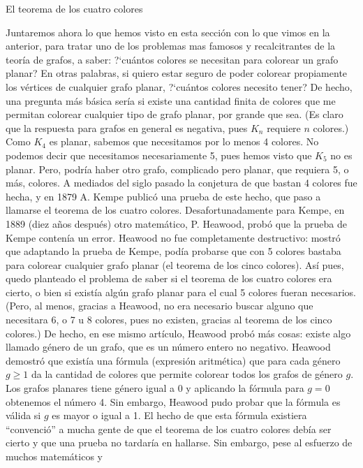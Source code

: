 \documentclass[11pt,spanish,makeidx]{amsbook}
\theoremstyle{definition}
\theoremstyle{remark}
\begin{document}
\begin{section}{El teorema de los cuatro colores} \label{Ap4.3}

Juntaremos ahora lo que hemos visto en esta sección con lo que
vimos en la anterior, para tratar uno de los problemas mas famosos
y recalcitrantes de la teoría de grafos, a saber: ?`cuántos
colores se necesitan para colorear un grafo planar? En otras
palabras, si quiero estar seguro de poder colorear propiamente los
vértices de cualquier grafo planar, ?`cuántos colores necesito
tener? De hecho, una pregunta más básica sería si existe una
cantidad finita de colores que me permitan colorear cualquier tipo
de grafo planar, por grande que sea. (Es claro que la respuesta
para grafos en general es negativa, pues $K_n$ requiere $n$
colores.) Como $K_4$ es planar, sabemos que necesitamos por lo
menos 4 colores. No podemos decir que necesitamos necesariamente
5, pues hemos visto que $K_5$ no es planar. Pero, podría haber
otro grafo, complicado pero planar, que requiera 5, o más,
colores. A mediados del siglo pasado la conjetura de que bastan 4
colores fue hecha, y en 1879 A. Kempe publicó una prueba de este
hecho, que paso a llamarse el teorema de los cuatro colores.
Desafortunadamente para Kempe, en 1889 (diez años después) otro
matemático, P. Heawood, probó que la prueba de Kempe contenía un
error. Heawood no fue completamente destructivo: mostró que
adaptando la prueba de Kempe, podía probarse que con 5 colores
bastaba para colorear cualquier grafo planar (el teorema de los
cinco colores). Así pues, quedo planteado el problema de saber si
el teorema de los cuatro colores era cierto, o bien si existía
algún grafo planar para el cual 5 colores fueran necesarios.
(Pero, al menos, gracias a Heawood, no era necesario buscar alguno
que necesitara 6, o 7 u 8 colores, pues no existen, gracias al
teorema de los cinco colores.) De hecho, en ese mismo artículo,
Heawood probó más cosas: existe algo llamado género de un grafo,
que es un número entero no negativo. Heawood demostró que existía
una  fórmula (expresión aritmética) que
para cada género $g\ge 1$ da la cantidad de colores que permite
colorear todos los grafos de género $g$. Los grafos planares tiene
género igual a 0 y aplicando la fórmula para $g=0$ obtenemos el
número 4. Sin embargo, Heawood pudo probar que la fórmula es
válida si $g$ es mayor o igual a 1. El hecho de que esta fórmula
existiera ``convenció'' a mucha gente de que el teorema de los
cuatro colores debía ser cierto y que una prueba no tardaría en
hallarse. Sin embargo, pese al esfuerzo de muchos matemáticos y

\end{section}
\end{document}
